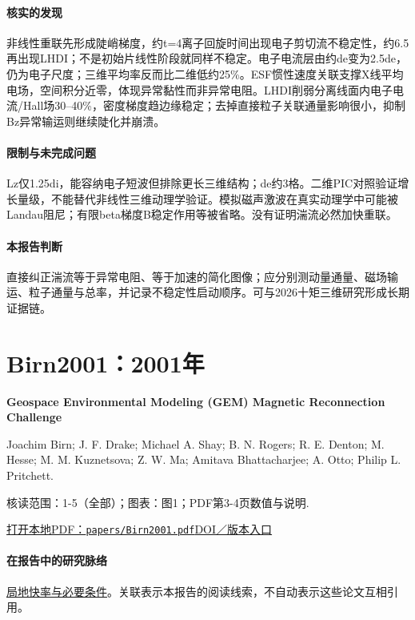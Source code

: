 \paragraph{核实的发现}非线性重联先形成陡峭梯度，约t=4离子回旋时间出现电子剪切流不稳定性，约6.5再出现LHDI；不是初始片线性阶段就同样不稳定。电子电流层由约de变为2.5de，仍为电子尺度；三维平均率反而比二维低约25\%。ESF惯性速度关联支撑X线平均电场，空间积分近零，体现异常黏性而非异常电阻。LHDI削弱分离线面内电子电流/Hall场30–40\%，密度梯度趋边缘稳定；去掉直接粒子关联通量影响很小，抑制Bz异常输运则继续陡化并崩溃。

\paragraph{限制与未完成问题}Lz仅1.25di，能容纳电子短波但排除更长三维结构；de约3格。二维PIC对照验证增长量级，不能替代非线性三维动理学验证。模拟磁声激波在真实动理学中可能被Landau阻尼；有限beta梯度B稳定作用等被省略。没有证明湍流必然加快重联。

\paragraph{本报告判断}直接纠正湍流等于异常电阻、等于加速的简化图像；应分别测动量通量、磁场输运、粒子通量与总率，并记录不稳定性启动顺序。可与2026十矩三维研究形成长期证据链。

\section{Birn2001：2001年}\label{paper:Birn2001}

\textbf{Geospace Environmental Modeling (GEM) Magnetic Reconnection Challenge}\citep{Birn2001}\

Joachim Birn;  J. F. Drake;  Michael A. Shay;  B. N. Rogers;  R. E. Denton;  M. Hesse;  M. M. Kuznetsova;  Z. W. Ma;  Amitava Bhattacharjee;  A. Otto;  Philip L. Pritchett.

\textsf{核读范围：}1-5（全部）；\textsf{图表：}图1；PDF第3-4页数值与说明.

\href{run:papers/Birn2001.pdf}{打开本地PDF：\texttt{papers/Birn2001.pdf}}\quad\href{https://doi.org/10.1029/1999ja900449}{DOI／版本入口}

\paragraph{在报告中的研究脉络}\hyperref[story:fast]{局地快率与必要条件}。关联表示本报告的阅读线索，不自动表示这些论文互相引用。

